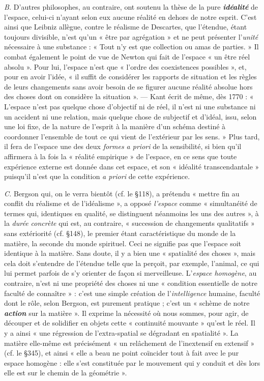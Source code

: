 {\it B.} D’autres philosophes, au contraire, ont soutenu la thèse de la
pure \textbf{\textit {idéalité}} de l’espace, celui-ci n’ayant selon eux aucune réalité
en dehors de notre esprit. C’est ainsi que Leibniz allègue, contre le
réalisme de Descartes, que l’étendue, étant toujours divisible, n’est
qu’un « être par agrégation » et ne peut présenter l’{\it unité} nécessaire à
une substance : « Tout n’y est que collection ou amas de parties. » Il
combat également le point de vue de Newton qui fait de l’espace « un
être réel absolu ». Pour lui, l’espace n’est que « l’ordre des coexistences
possibles », et, pour en avoir l’idée, « il suffit de considérer les rapports
de situation et les règles de leurs changements sans avoir
besoin de se figurer aucune réalité absolue hors des choses dont on
considère la situation ». — Kant écrit de même, dès 1770 : « L'espace
n’est pas quelque chose d’objectif ni de réel, il n’est ni une substance
ni un accident ni une relation, mais quelque chose de subjectif et
d’idéal, issu, selon une loi fixe, de la nature de l’esprit à la manière
d’un schéma destiné à coordonner l’ensemble de tout ce qui vient de
l’extérieur par les sens. » Plus tard, il fera de l’espace une des deux
{\it formes a priori} de la sensibilité, si bien qu’il affirmera à la fois la
« réalité empirique » de l’espace, en ce sens que toute expérience
externe est donnée dans cet espace, et son « idéalité transcendantale »
puisqu'il n’est que la condition {\it a priori} de cette expérience.

{\it C.} Bergson qui, on le verra bientôt (cf. le \S 118), a prétendu
« mettre fin au conflit du réalisme et de l’idéalisme », a opposé
{\it l’espace} comme « simultanéité de termes qui, identiques en qualité,
se distinguent néanmoins les uns des autres », à la {\it durée concrète} qui
est, au contraire, « succession de changements qualitatifs » sans extériorité
(cf. \S 148), le premier étant caractéristique du monde de la
matière, la seconde du monde spirituel. Ceci ne signifie pas que
l’espace soit identique à la matière. Sans doute, il y a bien une « spatialité
des choses », mais cela doit s’entendre de l’étendue telle que la
perçoit, par exemple, l’animal, ce qui lui permet parfois de s’y orienter
de façon si merveilleuse. L’{\it espace homogène}, au contraire, n’est ni
une propriété des choses ni une « condition essentielle de notre faculté
de connaître » : c’est une simple création de l'{\it intelligence} humaine,
faculté dont le rôle, selon Bergson, est purement pratique ; c’est un
« schème de notre \textbf{\textit {action}} sur la matière ». Il exprime la nécessité où
nous sommes, pour agir, de découper et de solidifier en objets cette
« continuité mouvante » qu'est le réel. Il y a ainsi « une régression de
l’extra-spatial se dégradant en spatialité ». La matière elle-même est
précisément « un relâchement de l’inextensif en extensif » (cf. le \S 345),
et ainsi « elle a beau ne point coïncider tout à fait avec le pur espace
homogène : elle s’est constituée par le mouvement qui y conduit et
dès lors elle est sur le chemin de la géométrie ».

